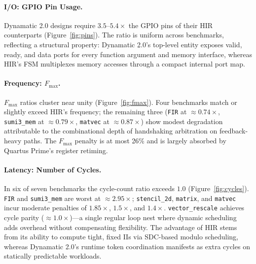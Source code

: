 \documentclass[sigplan,10pt,review,nonacm]{acmart}
\begin{document}
\paragraph{I/O: GPIO Pin Usage.}
Dynamatic 2.0 designs require $3.5$--$5.4\times$ the GPIO pins of their HIR
counterparts (Figure~\ref{fig:pins}). The ratio is uniform across
benchmarks, reflecting a structural property: Dynamatic 2.0's top-level
entity exposes valid, ready, and data ports for every function argument
and memory interface, whereas HIR's FSM multiplexes memory accesses
through a compact internal port map.

\paragraph{Frequency: $F_{\max}$.}
$F_{\max}$ ratios cluster near unity (Figure~\ref{fig:fmax}). Four
benchmarks match or slightly exceed HIR's frequency; the remaining
three (\texttt{FIR} at ${\approx}0.74\times$, \texttt{sumi3\_mem} at
${\approx}0.79\times$, \texttt{matvec} at ${\approx}0.87\times$) show
modest degradation attributable to the combinational depth of
handshaking arbitration on feedback-heavy paths. The $F_{\max}$ penalty
is at most 26\% and is largely absorbed by Quartus Prime's register
retiming.

\paragraph{Latency: Number of Cycles.}
In six of seven benchmarks the cycle-count ratio exceeds $1.0$
(Figure~\ref{fig:cycles}). \texttt{FIR} and \texttt{sumi3\_mem} are
worst at ${\approx}2.95\times$; \texttt{stencil\_2d}, \texttt{matrix},
and \texttt{matvec} incur moderate penalties of $1.85\times$,
$1.5\times$, and $1.4\times$. \texttt{vector\_rescale} achieves cycle
parity (${\approx}1.0\times$)---a single regular loop nest where dynamic
scheduling adds overhead without compensating flexibility. The advantage
of HIR stems from its ability to compute tight, fixed IIs via SDC-based
modulo scheduling, whereas Dynamatic 2.0's runtime token coordination
manifests as extra cycles on statically predictable workloads.
\end{document}
